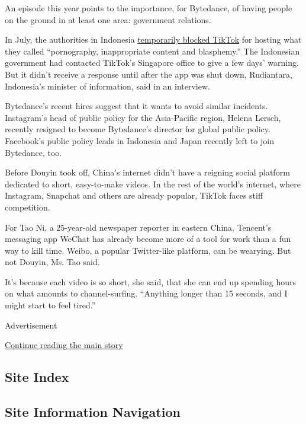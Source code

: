 An episode this year points to the importance, for Bytedance, of having
people on the ground in at least one area: government relations.

In July, the authorities in Indonesia
\href{http://www.thejakartapost.com/news/2018/07/03/what-is-tik-tok-an-app-blocked-before-we-older-people-even-heard-of-it.html}{temporarily
blocked TikTok} for hosting what they called ``pornography,
inappropriate content and blasphemy.'' The Indonesian government had
contacted TikTok's Singapore office to give a few days' warning. But it
didn't receive a response until after the app was shut down, Rudiantara,
Indonesia's minister of information, said in an interview.

Bytedance's recent hires suggest that it wants to avoid similar
incidents. Instagram's head of public policy for the Asia-Pacific
region, Helena Lersch, recently resigned to become Bytedance's director
for global public policy. Facebook's public policy leads in Indonesia
and Japan recently left to join Bytedance, too.

Before Douyin took off, China's internet didn't have a reigning social
platform dedicated to short, easy-to-make videos. In the rest of the
world's internet, where Instagram, Snapchat and others are already
popular, TikTok faces stiff competition.

For Tao Ni, a 25-year-old newspaper reporter in eastern China, Tencent's
messaging app WeChat has already become more of a tool for work than a
fun way to kill time. Weibo, a popular Twitter-like platform, can be
wearying. But not Douyin, Ms. Tao said.

It's because each video is so short, she said, that she can end up
spending hours on what amounts to channel-surfing. ``Anything longer
than 15 seconds, and I might start to feel tired.''

Advertisement

\protect\hyperlink{after-bottom}{Continue reading the main story}

\hypertarget{site-index}{%
\subsection{Site Index}\label{site-index}}

\hypertarget{site-information-navigation}{%
\subsection{Site Information
Navigation}\label{site-information-navigation}}

